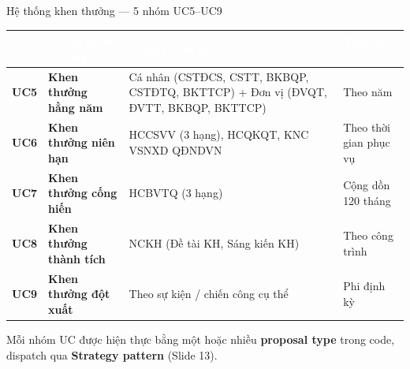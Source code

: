 \documentclass[aspectratio=43,xcolor=table]{beamer}
\newcommand{\highlight}[1]{\textcolor{hustred}{\textbf{#1}}}
\begin{document}
\begin{frame}{Hệ thống khen thưởng --- 5 nhóm UC5--UC9}
  \scriptsize
  \begin{tabularx}{\textwidth}{|c|>{\raggedright\arraybackslash}p{2.4cm}|>{\raggedright\arraybackslash}X|>{\raggedright\arraybackslash}p{2.6cm}|}
    \hline
    \rowcolor{hustred}\textcolor{white}{\textbf{UC}} & \textcolor{white}{\textbf{Nhóm khen thưởng}} & \textcolor{white}{\textbf{Phân rã chi tiết}} & \textcolor{white}{\textbf{Tiêu chí xét}} \\ \hline
    \textbf{UC5} & \textbf{Khen thưởng hằng năm} & Cá nhân (CSTĐCS, CSTT, BKBQP, CSTĐTQ, BKTTCP) + Đơn vị (ĐVQT, ĐVTT, BKBQP, BKTTCP) & Theo năm \\ \hline
    \textbf{UC6} & \textbf{Khen thưởng niên hạn} & HCCSVV (3 hạng), HCQKQT, KNC VSNXD QĐNDVN & Theo thời gian phục vụ \\ \hline
    \textbf{UC7} & \textbf{Khen thưởng cống hiến} & HCBVTQ (3 hạng) & Cộng dồn 120 tháng \\ \hline
    \textbf{UC8} & \textbf{Khen thưởng thành tích} & NCKH (Đề tài KH, Sáng kiến KH) & Theo công trình \\ \hline
    \textbf{UC9} & \textbf{Khen thưởng đột xuất} & Theo sự kiện / chiến công cụ thể & Phi định kỳ \\ \hline
  \end{tabularx}

  \vspace{0.4cm}
  \begin{block}{}
    Mỗi nhóm UC được hiện thực bằng một hoặc nhiều \highlight{proposal type} trong code, dispatch qua \highlight{Strategy pattern} (Slide 13).
  \end{block}
\end{frame}
\end{document}
